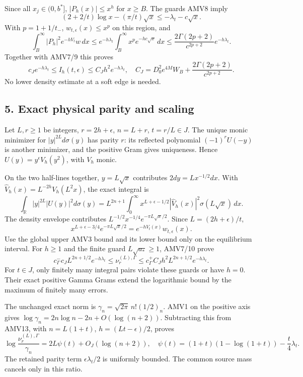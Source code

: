 \documentclass[11pt]{article}
\begin{document}
Since all \(x_j\in(0,b^*]\), \(|P_h(x)|\le x^h\) for \(x\ge B\). The guards AMV8 imply \[
(2+2/t)\log x-(\pi/t)\sqrt x\le-\lambda_t-c\sqrt x.
\] With \(p=1+1/t_-\), \(w_{t,\epsilon}(x)\le x^p\) on this region, and \[
\int_B^\infty |P_h|^2e^{-hV_t}w\,dx
\le e^{-h\lambda_t}\int_B^\infty x^p e^{-hc\sqrt x}\,dx
\le\frac{2\Gamma(2p+2)}{c^{2p+2}}e^{-h\lambda_t}.
\] Together with AMV7/9 this proves \[
c_Je^{-h\lambda_t}\le I_h(t,\epsilon)
\le C_Jh^2e^{-h\lambda_t},\quad
C_J=D_0^2e^{4M}W_B+\frac{2\Gamma(2p+2)}{c^{2p+2}}.
\tag{AMV10}
\] No lower density estimate at a soft edge is needed.

\subsection{5. Exact physical parity and scaling}\label{exact-physical-parity-and-scaling}

Let \(L,r\ge1\) be integers, \(r=2h+\epsilon\), \(n=L+r\), \(t=r/L\in J\). The unique monic minimizer for \(|y|^{2L}d\sigma(y)\) has parity \(r\): its reflected polynomial \((-1)^rU(-y)\) is another minimizer, and the positive Gram gives uniqueness. Hence \(U(y)=y^\epsilon V_h(y^2)\), with \(V_h\) monic.

On the two half-lines together, \(y=L\sqrt x\) contributes \(2dy=Lx^{-1/2}dx\). With \(\widehat V_h(x)=L^{-2h}V_h(L^2x)\), the exact integral is \[
\int_{\mathbb R}|y|^{2L}|U(y)|^2d\sigma(y)
=L^{2n+1}\int_0^\infty
x^{L+\epsilon-1/2}|\widehat V_h(x)|^2\sigma(L\sqrt x)\,dx.
\tag{AMV11}
\] The density envelope contributes \(L^{-1/2}x^{-1/4}e^{-\pi L\sqrt x/2}\). Since \(L=(2h+\epsilon)/t\), \[
x^{L+\epsilon-3/4}e^{-\pi L\sqrt x/2}
=e^{-hV_t(x)}w_{t,\epsilon}(x).
\tag{AMV12}
\] Use the global upper AMV3 bound and its lower bound only on the equilibrium interval. For \(h\ge1\) and the finite guard \(L\sqrt{a_*}\ge1\), AMV7/10 prove \[
c_\Gamma^-c_J L^{2n+1/2}e^{-h\lambda_t}
\le\nu_r^{(L),\Gamma}
\le c_\Gamma^+C_Jh^2 L^{2n+1/2}e^{-h\lambda_t}.
\tag{AMV13}
\] For \(t\in J\), only finitely many integral pairs violate these guards or have \(h=0\). Their exact positive Gamma Grams extend the logarithmic bound by the maximum of finitely many errors.

The unchanged exact norm is \(\gamma_n=\sqrt{2\pi}\,n!(1/2)_n\). AMV1 on the positive axis gives \(\log\gamma_n=2n\log n-2n+O(\log(n+2))\). Subtracting this from AMV13, with \(n=L(1+t)\), \(h=(Lt-\epsilon)/2\), proves \[
\log\frac{\nu_r^{(L),\Gamma}}{\gamma_n}
=2L\psi(t)+O_J(\log(n+2)),\quad
\psi(t)=(1+t)(1-\log(1+t))-\frac t4\lambda_t.
\tag{AMV14}
\] The retained parity term \(\epsilon\lambda_t/2\) is uniformly bounded. The common source mass cancels only in this ratio.
\end{document}
